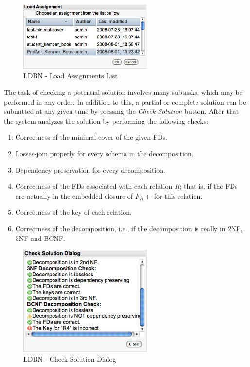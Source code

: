 \begin{figure}[h]
	\begin{center}
		\includegraphics[width=0.6\textwidth]{./img/screen02.png}
		\caption{LDBN - Load Assignments List}
		\label{fig:screen02}
	\end{center}
\end{figure}

The task of checking a potential solution
involves many subtasks, which may be performed in any order. In addition to this,  a partial or complete 
solution can be submitted at any given time by pressing the \textit{Check Solution} button. 
After that the system analyzes the solution by performing the following checks:
\begin{enumerate}
	\item Correctness of the minimal cover of the given FDs. 
	\item Losses-join properly for every schema in the decomposition.
	\item Dependency preservation for every decomposition.
	\item Correctness of the FDs associated with each relation $R$; that is, if the FDs are actually in the embedded closure of $F_{R}+$ for this relation.
	\item Correctness of the key of each relation.
	\item Correctness of the decomposition, i.e., if the decomposition is really in 2NF, 3NF and BCNF.
\end{enumerate}

\begin{figure}[h]
	\begin{center}
		\includegraphics[width=0.6\textwidth]{./img/screen03.png}
		\caption{LDBN - Check Solution Dialog}
		\label{fig:screen03}
	\end{center}
\end{figure}

